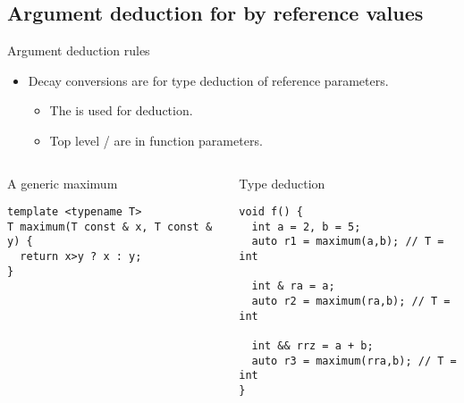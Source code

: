 \subsection{Argument deduction for by reference values}

\begin{frame}[t,fragile]{Argument deduction rules}
\begin{itemize}
  \item Decay conversions are  for type deduction of reference parameters.
    \begin{itemize}
      \item The  is used for deduction.
      \item Top level / are  in function parameters.
    \end{itemize}
\end{itemize}

\begin{columns}[T]

\begin{block}{A generic maximum}
\begin{lstlisting}
template <typename T>
T maximum(T const & x, T const & y) {
  return x>y ? x : y;
}
\end{lstlisting}
\end{block}

\begin{block}{Type deduction}
\begin{lstlisting}
void f() {
  int a = 2, b = 5;
  auto r1 = maximum(a,b); // T = int

  int & ra = a;
  auto r2 = maximum(ra,b); // T = int

  int && rrz = a + b;
  auto r3 = maximum(rra,b); // T = int
}
\end{lstlisting}
\end{block}
\end{columns}

\end{frame}

